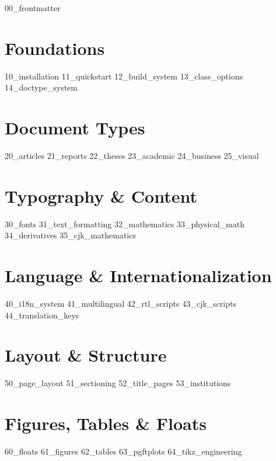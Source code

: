 \documentclass[
    language=english,
    doctype=manual,
    institution=none,
    titlestyle=book,
    oneside,
    enabletikz=false,
    enableengineering=false,
    loadGlossaries=true,
]{../../omnilatex}
\begin{document}
\maketitle

{00_frontmatter}

\part{Foundations}
{10_installation}
{11_quickstart}
{12_build_system}
{13_class_options}
{14_doctype_system}

\part{Document Types}
{20_articles}
{21_reports}
{22_theses}
{23_academic}
{24_business}
{25_visual}

\part{Typography \& Content}
{30_fonts}
{31_text_formatting}
{32_mathematics}
{33_physical_math}
{34_derivatives}
{35_cjk_mathematics}

\part{Language \& Internationalization}
{40_i18n_system}
{41_multilingual}
{42_rtl_scripts}
{43_cjk_scripts}
{44_translation_keys}

\part{Layout \& Structure}
{50_page_layout}
{51_sectioning}
{52_title_pages}
{53_institutions}

\part{Figures, Tables \& Floats}
{60_floats}
{61_figures}
{62_tables}
{63_pgftplots}
{64_tikz_engineering}
\end{document}
